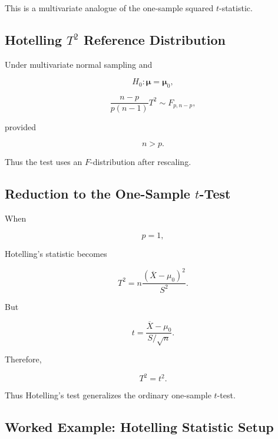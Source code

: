This is a multivariate analogue of the one-sample squared \(t\)-statistic.

\subsection{Hotelling \(T^2\) Reference Distribution}
\label{subsec:hotelling-reference-distribution}

Under multivariate normal sampling and

\[
H_0:
\boldsymbol{\mu}
=
\boldsymbol{\mu}_0,
\]

\[
\boxed{
\frac{
n-p
}{
p(n-1)
}
T^2
\sim
F_{p,n-p},
}
\]

provided

\[
\boxed{
n>p.
}
\]

Thus the test uses an \(F\)-distribution after rescaling.

\subsection{Reduction to the One-Sample \(t\)-Test}
\label{subsec:hotelling-reduction-t}

When

\[
p=1,
\]

Hotelling's statistic becomes

\[
T^2
=
n
\frac{
(\overline{X}-\mu_0)^2
}{
S^2
}.
\]

But

\[
t
=
\frac{
\overline{X}-\mu_0
}{
S/\sqrt{n}
}.
\]

Therefore,

\[
\boxed{
T^2=t^2.
}
\]

Thus Hotelling's test generalizes the ordinary one-sample \(t\)-test.

\subsection{Worked Example: Hotelling Statistic Setup}
\label{subsec:worked-hotelling-setup}

